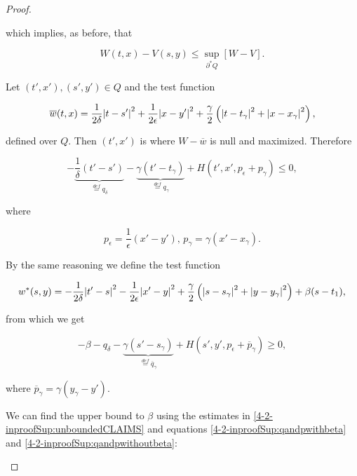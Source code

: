 \begin{proof}
\begin{enumerate}[label=\arabic*')]
        which implies, as before, that

        \[W(t,x) - V(s,y)\leq \sup_{\partial^{\ast}Q}[W-V].\]

        Let $(t',x'),(s',y')\in Q$ and the test function

        \[\overline{w}(t,x)=\frac{1}{2\delta}\abs{t-s'}^2+\frac{1}{2\epsilon}\abs{x-y'}^2+\frac{\gamma}{2}\left(\abs{t-t_{\gamma}}^2+\abs{x-x_{\gamma}}^2\right),\]

        defined over $Q$. Then $(t',x')$ is where $W-\overline{w}$ is null and maximized. Therefore

        \begin{equation}\label{4-2-inproofSup:qandpwithoutbeta}
             - \underbrace{\frac{1}{\delta}(t'-s')}_{\overset{def}{=}q_{\delta}}  - \underbrace{\gamma(t'-t_{\gamma})}_{\overset{def}{=}q_{\gamma}} + H(t',x',p_{\epsilon}+p_{\gamma}) \leq 0, 
        \end{equation}

        where

        \[p_{\epsilon}=\frac{1}{\epsilon}(x'-y'),\, p_{\gamma}=\gamma(x'-x_{\gamma}).\]

        By the same reasoning we define the test function

        \[w^{\ast}(s,y)=-\frac{1}{2\delta}\abs{t'-s}^2-\frac{1}{2\epsilon}\abs{x'-y}^2+\frac{\gamma}{2}\left(\abs{s-s_{\gamma}}^2+\abs{y-y_{\gamma}}^2\right)+\beta(s-t_1),\]

        from which we get

        \begin{equation}\label{4-2-inproofSup:qandpwithbeta}
            - \beta - q_{\delta}  - \underbrace{\gamma(s'-s_{\gamma})}_{\overset{def}{=}\overline{q}_{\gamma}} + H(s',y',p_{\epsilon}+\overline{p}_{\gamma}) \geq 0, 
       \end{equation}

       where $\overline{p}_{\gamma} = \gamma(y_{\gamma}-y').$

       We can find the upper bound to $\beta$ using the estimates in \ref{4-2-inproofSup:unboundedCLAIMS} and equations \ref{4-2-inproofSup:qandpwithbeta} and \ref{4-2-inproofSup:qandpwithoutbeta}:


\end{enumerate}
\end{proof}
